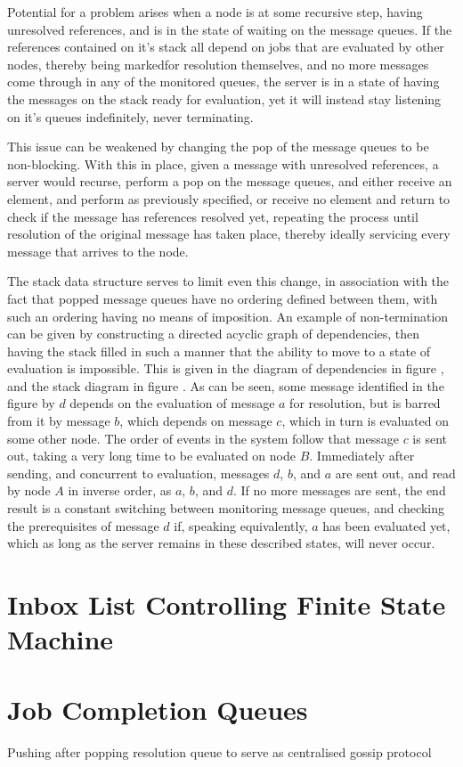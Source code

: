 \documentclass[a4paper,10pt]{article}
\begin{document}
Potential for a problem arises when a node is at some recursive step, having
unresolved references, and is in the state of waiting on the message queues.
If the references contained on it's stack all depend on jobs that are evaluated
by other nodes, thereby being markedfor resolution themselves, and no more
messages come through in any of the monitored queues, the server is in a state
of having the messages on the stack ready for evaluation, yet it will instead
stay listening on it's queues indefinitely, never terminating.

This issue can be weakened by changing the pop of the message queues to be
non-blocking.
With this in place, given a message with unresolved references, a server would
recurse, perform a pop on the message queues, and either receive an element,
and perform as previously specified, or receive no element and return to check
if the message has references resolved yet, repeating the process until
resolution of the original message has taken place, thereby ideally servicing
every message that arrives to the node.

The stack data structure serves to limit even this change, in association with
the fact that popped message queues have no ordering defined between them, with
such an ordering having no means of imposition.
An example of non-termination can be given by constructing a directed acyclic
graph of dependencies, then having the stack filled in such a manner that the
ability to move to a state of evaluation is impossible.
This is given in the diagram of dependencies in figure , and the stack diagram
in figure .
As can be seen, some message identified in the figure by \(d\) depends on the
evaluation of message \(a\) for resolution, but is barred from it by message
\(b\), which depends on message \(c\), which in turn is evaluated on some other
node.
The order of events in the system follow that message \(c\) is sent out, taking
a very long time to be evaluated on node \(B\).
Immediately after sending, and concurrent to evaluation, messages \(d\), \(b\),
and \(a\) are sent out, and read by node \(A\) in inverse order, as \(a\),
\(b\), and \(d\).
If no more messages are sent, the end result is a constant switching between
monitoring message queues, and checking the prerequisites of message \(d\) if,
speaking equivalently, \(a\) has been evaluated yet, which as long as the
server remains in these described states, will never occur.

\section{Inbox List Controlling Finite State Machine}

\section{Job Completion Queues}
Pushing after popping resolution queue to serve as centralised gossip protocol
\end{document}
